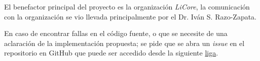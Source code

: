 \documentclass{article}
\begin{document}
        El benefactor principal del proyecto es la organización \textit{LiCore}, la comunicación con la organización se vio llevada principalmente por el Dr. Iván S. Razo-Zapata.

        En caso de encontrar fallas en el código fuente, o que se necesite de una aclaración de la implementación propuesta; se pide que se abra un \textit{issue} en el repositorio en GitHub que puede ser accedido desde la siguiente \href{https://github.com/JuanEcheagaray75/licore-pki}{liga}.

    \clearpage
    
    
\end{document}
